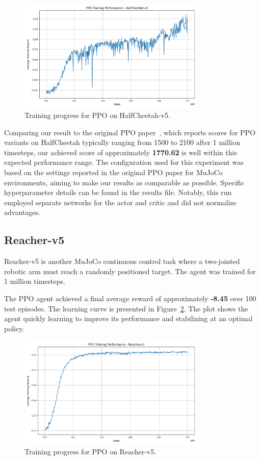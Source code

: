 \begin{figure}[H]
    \centering
    \includegraphics[width=0.8\textwidth]{figures/halfcheetah_training_plot.png}
    \caption{Training progress for PPO on HalfCheetah-v5.}
    \label{fig:halfcheetah_training}
\end{figure}

Comparing our result to the original PPO paper~\cite{schulman2017proximal}, which reports scores for PPO variants on HalfCheetah typically ranging from 1500 to 2100 after 1 million timesteps, our achieved score of approximately \textbf{1770.62} is well within this expected performance range. The configuration used for this experiment was based on the settings reported in the original PPO paper for MuJoCo environments, aiming to make our results as comparable as possible. Specific hyperparameter details can be found in the results file. Notably, this run employed separate networks for the actor and critic and did not normalize advantages.

\subsection{Reacher-v5}
Reacher-v5 is another MuJoCo continuous control task where a two-jointed robotic arm must reach a randomly positioned target. The agent was trained for 1 million timesteps.

The PPO agent achieved a final average reward of approximately \textbf{-8.45} over 100 test episodes. The learning curve is presented in Figure~\ref{fig:reacher_training}. The plot shows the agent quickly learning to improve its performance and stabilizing at an optimal policy.

\begin{figure}[H]
    \centering
    \includegraphics[width=0.8\textwidth]{figures/reacher_training_plot.png}
    \caption{Training progress for PPO on Reacher-v5.}
    \label{fig:reacher_training}
\end{figure}

